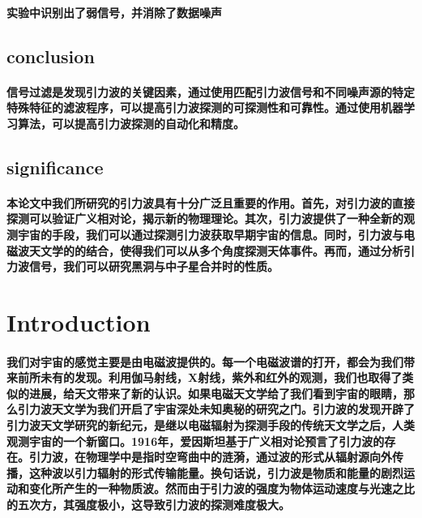 \documentclass{article}
\begin{document}
\paragraph{实验中识别出了弱信号，并消除了数据噪声}
\subsection{conclusion}
\paragraph{信号过滤是发现引力波的关键因素，通过使用匹配引力波信号和不同噪声源的特定特殊特征的滤波程序，可以提高引力波探测的可探测性和可靠性。通过使用机器学习算法，可以提高引力波探测的自动化和精度。}
\subsection{significance}
\paragraph{本论文中我们所研究的引力波具有十分广泛且重要的作用。首先，对引力波的直接探测可以验证广义相对论，揭示新的物理理论。其次，引力波提供了一种全新的观测宇宙的手段，我们可以通过探测引力波获取早期宇宙的信息。同时，引力波与电磁波天文学的的结合，使得我们可以从多个角度探测天体事件。再而，通过分析引力波信号，我们可以研究黑洞与中子星合并时的性质。}
\section{Introduction}
\paragraph{我们对宇宙的感觉主要是由电磁波提供的。每一个电磁波谱的打开，都会为我们带来前所未有的发现。利用伽马射线，X射线，紫外和红外的观测，我们也取得了类似的进展，给天文带来了新的认识。如果电磁天文学给了我们看到宇宙的眼睛，那么引力波天文学为我们开启了宇宙深处未知奥秘的研究之门。引力波的发现开辟了引力波天文学研究的新纪元，是继以电磁辐射为探测手段的传统天文学之后，人类观测宇宙的一个新窗口。1916年，爱因斯坦基于广义相对论预言了引力波的存在。引力波，在物理学中是指时空弯曲中的涟漪，通过波的形式从辐射源向外传播，这种波以引力辐射的形式传输能量。换句话说，引力波是物质和能量的剧烈运动和变化所产生的一种物质波。然而由于引力波的强度为物体运动速度与光速之比的五次方，其强度极小，这导致引力波的探测难度极大。}
\end{document}
